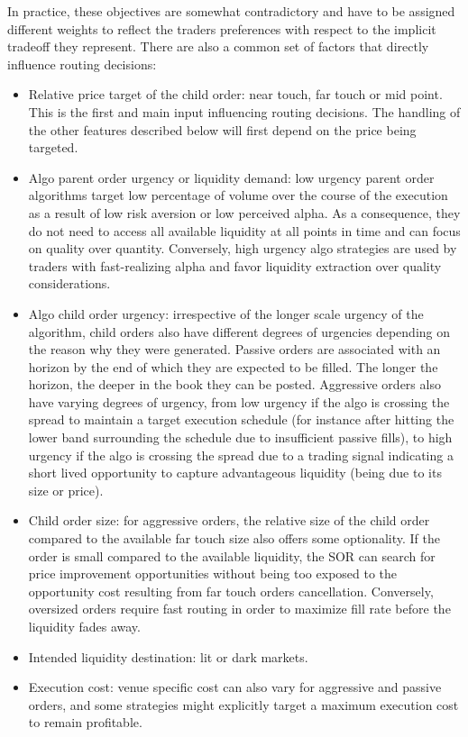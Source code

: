 In practice, these objectives are somewhat contradictory and have to be assigned different weights to reflect the traders preferences with respect to the implicit tradeoff they represent. There are also a common set of factors that directly influence routing decisions:
\begin{itemize}
\item Relative price target of the child order: near touch, far touch or mid point. This is the first and main input influencing routing decisions. The handling of the other features described below will first depend on the price being targeted.
\item Algo parent order urgency or liquidity demand: low urgency parent order algorithms target low percentage of volume over the course of the execution as a result of low risk aversion or low perceived alpha. As a consequence, they do not need to access all available liquidity at all points in time and can focus on quality over quantity. Conversely, high urgency algo strategies are used by traders with fast-realizing alpha and favor liquidity extraction over quality considerations.
\item Algo child order urgency: irrespective of the longer scale urgency of the algorithm, child orders also have different degrees of urgencies depending on the reason why they were generated. Passive orders are associated with an horizon by the end of which they are expected to be filled. The longer the horizon, the deeper in the book they can be posted. Aggressive orders also have varying degrees of urgency, from low urgency if the algo is crossing the spread to maintain a target execution schedule (for instance after hitting the lower band surrounding the schedule due to insufficient passive fills), to high urgency if the algo is crossing the spread due to a trading signal indicating a short lived opportunity to capture advantageous liquidity (being due to its size or price).
\item Child order size: for aggressive orders, the relative size of the child order compared to the available far touch size also offers some optionality. If the order is small compared to the available liquidity, the SOR can search for price improvement opportunities without being too exposed to the opportunity cost resulting from far touch orders cancellation. Conversely, oversized orders require fast routing in order to maximize fill rate before the liquidity fades away.
\item Intended liquidity destination: lit or dark markets.
\item Execution cost: venue specific cost can also vary for aggressive and passive orders, and some strategies might explicitly target a maximum execution cost to remain profitable. \twomedskip
\end{itemize}



